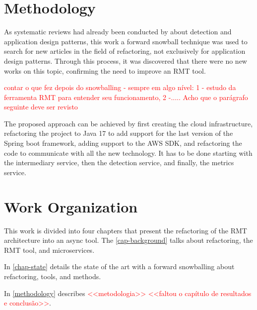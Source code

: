 \section{Methodology}
As systematic reviews had already been conducted by \textcite{beluzzo2018abordagem} about detection and application design patterns, this work a forward snowball technique was used to search for new articles in the field of refactoring, not exclusively for application design patterns. Through this process, it was discovered that there were no new works on this topic, confirming the need to improve an RMT tool.

\textcolor{red}{contar o que fez depois do snowballing - sempre em algo nível: 1 - estudo da ferramenta RMT para entender seu funcionamento, 2 -..... Acho que o parágrafo seguinte deve ser revisto}

The proposed approach can be achieved by first creating the cloud infrastructure, refactoring the project to Java 17 to add support for the last version of the Spring boot framework, adding support to the AWS SDK, and refactoring the code to communicate with all the new technology. It has to be done starting with the intermediary service, then the detection service, and finally, the metrics service.


\section{Work Organization}

This work is divided into four chapters that present the refactoring of the RMT architecture into an async tool. The \cref{cap-background} talks about refactoring, the RMT tool, and microservices.

In \cref{chap-state} details the state of the art with a forward snowballing about refactoring, tools, and methods.

In \cref{methodology} describes \textcolor{red}{<<metodologia>> <<faltou o capítulo de resultados e conclusão>>}.